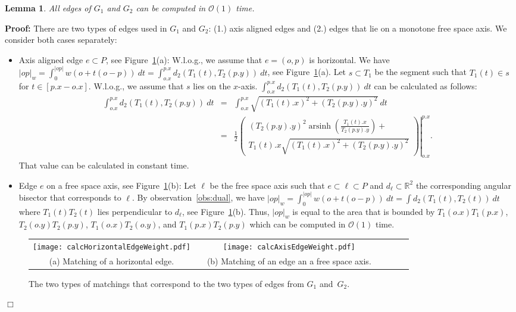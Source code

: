 \documentclass[a4paper,11pt]{article}
\newtheorem{lemma}{Lemma}
\newenvironment{proof}{\textbf{Proof:}}{\hspace*{0mm}\hfill\ensuremath{\Box}}
\begin{document}
\begin{lemma}\label{lem:edgesComputable}
	All edges of $G_1$ and $G_2$ can be computed in $\mathcal{O}(1)$ time.
\end{lemma}
\begin{proof}
	There are two types of edges used in $G_1$ and $G_2$: (1.) axis aligned edges and (2.) edges that lie on a monotone free space axis. We consider both cases separately:
		\begin{itemize}
			\item Axis aligned edge $e \subset P$, see Figure~\ref{fig:edgeWeight}(a): W.l.o.g., we assume that $e = (o,p)$ is horizontal. We have $|op|_w = \int_{0}^{|op|} w(o + t (o-p)) \ dt = \int_{o.x}^{p.x}d_2(T_1(t),T_2(p.y)) \ dt$, see Figure~\ref{fig:edgeWeight}(a). Let $s \subset T_1$ be the segment such that $T_1(t) \in s$ for $t \in [p.x-o.x]$. W.l.o.g., we assume that $s$ lies on the $x$-axis. $\int_{o.x}^{p.x}d_2(T_1(t),T_2(p.y)) \ dt$ can be calculated as follows:
					\begin{eqnarray*}
						\int_{o.x}^{p.x}d_2(T_1(t),T_2(p.y)) \ dt & = & \int_{o.x}^{p.x} \sqrt{(T_1(t).x)^2 + (T_2(p.y).y)^2} \ dt\\
						& =&\left. \frac{1}{2}\left( \begin{matrix}
							(T_2(p.y).y)^2 \operatorname{arsinh} \left( \frac{T_1(t).x}{T_2(p.y).y} \right) +\\ 
							T_1(t).x \sqrt{(T_1(t).x)^2 + (T_2(p.y).y)^2}							\end{matrix} \right) \right|^{p.x}_{o.x}.
					\end{eqnarray*}
				That value can be calculated in constant time.
			\item Edge $e$ on a free space axis, see Figure~\ref{fig:edgeWeight}(b): Let $\ell$ be the free space axis such that $e \subset \ell \subset P$ and $d_{\ell} \subset \mathbb{R}^2$ the corresponding angular bisector that corresponds to $\ell$. By observation~\ref{obs:dual}, we have $|op|_w = \int_{0}^{|op|}w(o + t(o-p)) \ dt = \int d_2(T_1(t), T_2(t)) \ dt$ where $T_1(t) T_2(t)$ lies perpendicular to $d_{\ell}$, see Figure~\ref{fig:edgeWeight}(b). Thus, $|op|_w$ is equal to the area that is bounded by $T_1(o.x)T_1(p.x)$, $T_2(o.y)T_2(p.y)$, $T_1(o.x)T_2(o.y)$, and $T_1(p.x)T_2(p.y)$ which can be computed in $\mathcal{O}(1)$ time.
		\end{itemize}
		
		\begin{figure}[ht]
  \begin{center}
    \begin{tabular}{ccccccc}
      \texttt{[image: calcHorizontalEdgeWeight.pdf]} & &
       \texttt{[image: calcAxisEdgeWeight.pdf]}&&\\ 
{\small (a) Matching of a horizontal edge.} & &
      {\small (b) Matching of an edge an a free space axis.}&&
    \end{tabular}
  \end{center}
  \vspace*{-12pt}
  \caption{The two types of matchings that correspond to the two types of edges from $G_1$ and~$G_2$.}
  \label{fig:edgeWeight}
\end{figure}
\end{proof}
\end{document}
